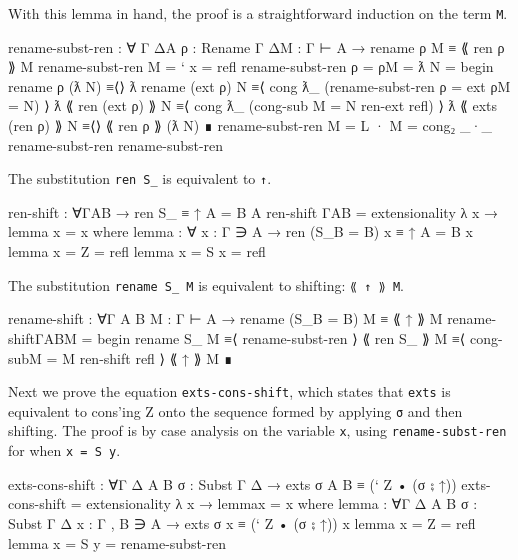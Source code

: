 With this lemma in hand, the proof is a straightforward induction on the
term \texttt{M}.

\begin{fence}
\begin{code}
rename-subst-ren : ∀ {Γ Δ}{A} {ρ : Rename Γ Δ}{M : Γ ⊢ A}
                 → rename ρ M ≡ ⟪ ren ρ ⟫ M
rename-subst-ren {M = ` x} = refl
rename-subst-ren {ρ = ρ}{M = ƛ N} =
  begin
      rename ρ (ƛ N)
    ≡⟨⟩
      ƛ rename (ext ρ) N
    ≡⟨ cong ƛ_ (rename-subst-ren {ρ = ext ρ}{M = N}) ⟩
      ƛ ⟪ ren (ext ρ) ⟫ N
    ≡⟨ cong ƛ_ (cong-sub {M = N} ren-ext refl) ⟩
      ƛ ⟪ exts (ren ρ) ⟫  N
    ≡⟨⟩
      ⟪ ren ρ ⟫ (ƛ N)
  ∎
rename-subst-ren {M = L · M} = cong₂ _·_ rename-subst-ren rename-subst-ren
\end{code}
\end{fence}

The substitution \texttt{ren\ S\_} is equivalent to \texttt{↑}.

\begin{fence}
\begin{code}
ren-shift : ∀{Γ}{A}{B}
          → ren S_ ≡ ↑ {A = B} {A}
ren-shift {Γ}{A}{B} = extensionality λ x → lemma {x = x}
  where
  lemma : ∀ {x : Γ ∋ A} → ren (S_{B = B}) x ≡ ↑ {A = B} x
  lemma {x = Z} = refl
  lemma {x = S x} = refl
\end{code}
\end{fence}

The substitution \texttt{rename\ S\_\ M} is equivalent to shifting:
\texttt{⟪\ ↑\ ⟫\ M}.

\begin{fence}
\begin{code}
rename-shift : ∀{Γ} {A} {B} {M : Γ ⊢ A}
             → rename (S_{B = B}) M ≡ ⟪ ↑ ⟫ M
rename-shift{Γ}{A}{B}{M} =
  begin
    rename S_ M
  ≡⟨ rename-subst-ren ⟩
    ⟪ ren S_ ⟫ M
  ≡⟨ cong-sub{M = M} ren-shift refl ⟩
    ⟪ ↑ ⟫ M
  ∎
\end{code}
\end{fence}

Next we prove the equation \texttt{exts-cons-shift}, which states that
\texttt{exts} is equivalent to cons'ing Z onto the sequence formed by
applying \texttt{σ} and then shifting. The proof is by case analysis on
the variable \texttt{x}, using \texttt{rename-subst-ren} for when
\texttt{x\ =\ S\ y}.

\begin{fence}
\begin{code}
exts-cons-shift : ∀{Γ Δ} {A B} {σ : Subst Γ Δ}
                → exts σ {A} {B} ≡ (` Z • (σ ⨟ ↑))
exts-cons-shift = extensionality λ x → lemma{x = x}
  where
  lemma : ∀{Γ Δ} {A B} {σ : Subst Γ Δ} {x : Γ , B ∋ A}
                  → exts σ x ≡ (` Z • (σ ⨟ ↑)) x
  lemma {x = Z} = refl
  lemma {x = S y} = rename-subst-ren
\end{code}
\end{fence}

